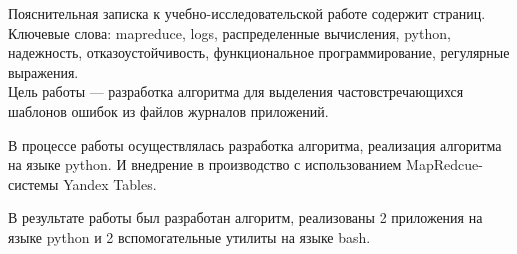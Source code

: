 Пояснительная записка к учебно-исследовательской работе содержит
\pageref{LastPage} страниц.\\

Ключевые слова: mapreduce, logs, распределенные вычисления, python, надежность,
отказоустойчивость, функциональное программирование, регулярные выражения.\\

Цель работы --- разработка алгоритма для выделения частовстречающихся шаблонов
ошибок из файлов журналов приложений.

В процессе работы осуществлялась разработка алгоритма, реализация алгоритма на
языке python. И внедрение в производство с использованием MapRedcue-системы
Yandex Tables.

В результате работы был разработан алгоритм, реализованы 2 приложения на языке
python и 2 вспомогательные утилиты на языке bash.
